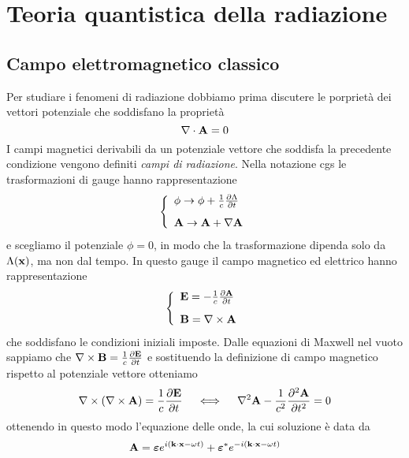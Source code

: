 \section{Teoria quantistica della radiazione}

\subsection{Campo elettromagnetico classico}

Per studiare i fenomeni di radiazione dobbiamo prima discutere le porpriet\`a dei vettori potenziale che soddisfano la propriet\`a 
\begin{equation*}
	\nabla \cdot \bold{A} = 0
\end{equation*}
I campi magnetici derivabili da un potenziale vettore che soddisfa la precedente condizione vengono definiti \textit{campi di radiazione}. Nella notazione cgs le trasformazioni di gauge hanno rappresentazione
\begin{equation*}
	\left \{ \begin{array}{l}
		\phi \to \phi + \frac{1}{c}\frac{\partial \Lambda}{\partial t} \\[0.3cm]
		\bold{A} \to \bold{A} + \nabla \bold{A}
	\end{array}\right.
\end{equation*}
e scegliamo il potenziale $\phi = 0$, in modo che la trasformazione dipenda solo da $\Lambda(\bold{x})$, ma non dal tempo. In questo gauge il campo magnetico ed elettrico hanno rappresentazione
\begin{equation*}
	\left \{ \begin{array}{l}
		\bold{E} = - \frac{1}{c}\frac{\partial \bold{A}}{\partial t}\\[0.3cm]
		\bold{B} = \nabla \times \bold{A}
	\end{array}\right.
\end{equation*}
che soddisfano le condizioni iniziali imposte. Dalle equazioni di Maxwell nel vuoto sappiamo che $\nabla \times \bold{B} = \frac{1}{c} \frac{\partial \bold{E}}{\partial t}$ e sostituendo la definizione di campo magnetico rispetto al potenziale vettore otteniamo
\begin{equation}
	\nabla \times (\nabla \times \bold{A}) = \frac{1}{c}\frac{\partial \bold{E}}{\partial t} \quad \iff \quad \nabla^2\bold{A} -\frac{1}{c^2}\frac{\partial^2 \bold{A}}{\partial t^2} = 0
\end{equation}
ottenendo in questo modo l'equazione delle onde, la cui soluzione \`e data da
\begin{equation}
	\bold{A} = \boldsymbol{\varepsilon} e^{i(\bold{k} \cdot \bold{x} - \omega t)} + \boldsymbol{\varepsilon}^*e^{-i(\bold{k} \cdot \bold{x} - \omega t)}
\end{equation} 
